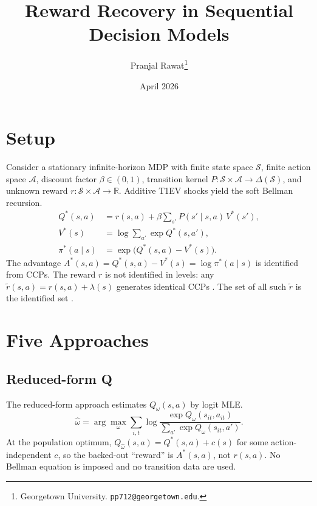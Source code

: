 \documentclass[11pt]{article}
\title{Reward Recovery in Sequential Decision Models}
\author{Pranjal Rawat\thanks{Georgetown University. \texttt{pp712@georgetown.edu}.}}
\date{April 2026}
\begin{document}
\maketitle

\section{Setup}

Consider a stationary infinite-horizon MDP with finite state space $\mathcal{S}$, finite action space $\mathcal{A}$, discount factor $\beta \in (0,1)$, transition kernel $P : \mathcal{S} \times \mathcal{A} \to \Delta(\mathcal{S})$, and unknown reward $r : \mathcal{S} \times \mathcal{A} \to \mathbb{R}$. Additive T1EV shocks yield the soft Bellman recursion.
\begin{align}
Q^*(s,a) &= r(s,a) + \beta \sum_{s'} P(s' \mid s,a)\, V^*(s'), \label{eq:bellman} \\
V^*(s) &= \log \sum_{a'} \exp Q^*(s,a'), \label{eq:value} \\
\pi^*(a \mid s) &= \exp\bigl(Q^*(s,a) - V^*(s)\bigr). \label{eq:policy}
\end{align}
The advantage $A^*(s,a) = Q^*(s,a) - V^*(s) = \log \pi^*(a \mid s)$ is identified from CCPs. The reward $r$ is not identified in levels: any $\tilde{r}(s,a) = r(s,a) + \lambda(s)$ generates identical CCPs \citep{magnac2002}. The set of all such $\tilde{r}$ is the identified set \citep{kalouptsidi2021}.

\section{Five Approaches}

\subsection{Reduced-form Q}

The reduced-form approach estimates $Q_\omega(s,a)$ by logit MLE.
\begin{equation}\label{eq:rf}
\hat\omega = \arg\max_\omega \sum_{i,t} \log \frac{\exp Q_\omega(s_{it},a_{it})}{\sum_{a'}\exp Q_\omega(s_{it},a')}.
\end{equation}
At the population optimum, $Q_{\hat\omega}(s,a) = Q^*(s,a) + c(s)$ for some action-independent $c$, so the backed-out ``reward'' is $A^*(s,a)$, not $r(s,a)$. No Bellman equation is imposed and no transition data are used.
\end{document}
